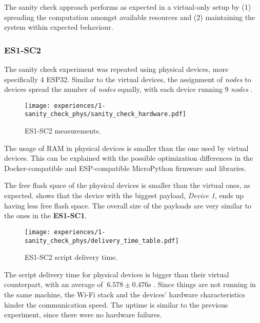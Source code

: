 The sanity check approach performs as expected in a virtual-only setup by (1) spreading the computation amongst available resources and (2) maintaining the system within expected behaviour.


\subsubsection{ES1-SC2}\label{sec:sanity_check_phys_exp}

The sanity check experiment was repeated using physical devices, more specifically 4 ESP32. Similar to the virtual devices, the assignment of \textit{nodes} to devices spread the number of \textit{nodes} equally, with each device running 9 \textit{nodes} .

\begin{figure}[h]
\centering
\texttt{[image: experiences/1-sanity\_check\_phys/sanity\_check\_hardware.pdf]}
\caption[ES1-SC2 measurements.]{ES1-SC2 measurements.}\label{fig:sanity_check_phys_graph}
\end{figure}

The usage of RAM in physical devices is smaller than the one used by virtual devices. This can be explained with the possible optimization differences in the Docker-compatible and ESP-compatible MicroPython firmware and libraries.

The free flash space of the physical devices is smaller than the virtual ones, as expected.  shows that the device with the biggest payload, \textit{Device 1}, ends up having less free flash space. The overall size of the payloads are very similar to the ones in the \textbf{ES1-SC1}. 

\begin{figure}[h]
\centering
\texttt{[image: experiences/1-sanity\_check\_phys/delivery\_time\_table.pdf]}
\caption[ES1-SC2 script delivery time.]{ES1-SC2 script delivery time.}\label{fig:sanity_check_phys_delivery_time}
\end{figure}

The script delivery time for physical devices is bigger than their virtual counterpart, with an average of $~6.578\pm0.476$s . Since things are not running in the same machine, the Wi-Fi stack and the devices' hardware  characteristics hinder the communication speed. The uptime is similar to the previous experiment, since there were no hardware failures.

